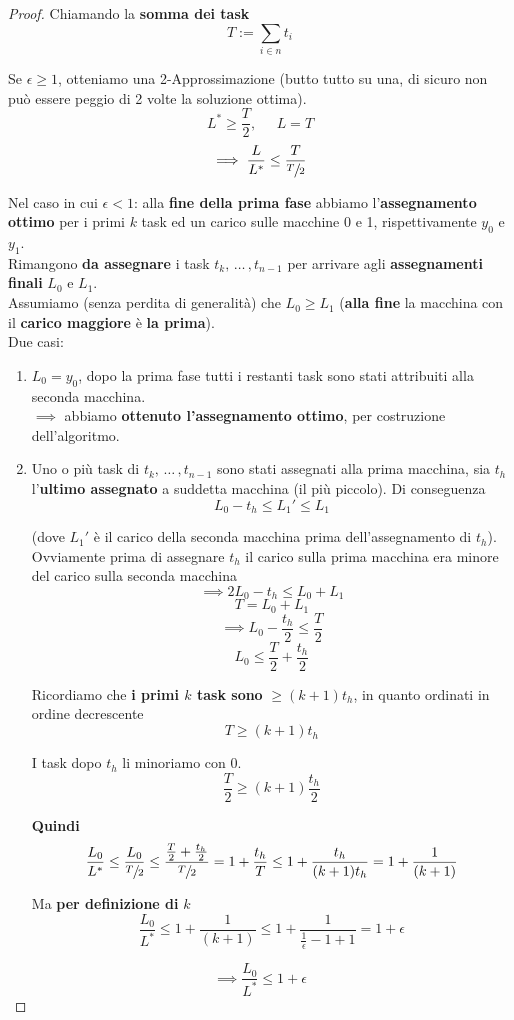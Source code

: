 \documentclass[11pt]{article}
\begin{document}
	\begin{proof}
		Chiamando la \textbf{somma dei task}
		$$ T := \sum_{i \in n} t_i$$
		
		Se $\epsilon \geq 1$, otteniamo una 2-Approssimazione (butto tutto su una, di sicuro non può essere peggio di 2 volte la soluzione ottima).
		$$ L^\ast \geq \frac{T}{2}, \;\;\;\;\; L = T $$
		$$\implies \frac{L}{L^\ast} \leq \frac{T}{\sfrac{T}{2}}$$
		
		Nel caso in cui $\epsilon < 1$: alla \textbf{fine della prima fase} abbiamo l'\textbf{assegnamento ottimo} per i primi $k$ task ed un carico sulle macchine 0 e 1, rispettivamente $y_0$ e $y_1$. \\
		
		Rimangono \textbf{da assegnare} i task $t_k, \, \dots \, , t_{n-1}$ per arrivare agli \textbf{assegnamenti finali} $L_0$ e $L_1$.\\
		
		Assumiamo (senza perdita di generalità) che $L_0 \geq L_1$ (\textbf{alla fine} la macchina con il \textbf{carico maggiore} è \textbf{la prima}).\\
		
		Due casi: 
		\begin{enumerate}
			\item $L_0 = y_0$, dopo la prima fase tutti i restanti task sono stati attribuiti alla seconda macchina.\\
			$\implies$ abbiamo \textbf{ottenuto l'assegnamento ottimo}, per costruzione dell'algoritmo.\\
			
			\item Uno o più task di $t_k, \, \dots \, , t_{n-1}$ sono stati assegnati alla prima macchina, sia $t_h$ l'\textbf{ultimo assegnato} a suddetta macchina (il più piccolo). Di conseguenza
			$$ L_0 - t_h \leq L_1' \leq L_1$$
			
			(dove $L_1'$ è il carico della seconda macchina prima dell'assegnamento di $t_h$). Ovviamente prima di assegnare $t_h$ il carico sulla prima macchina era minore del carico sulla seconda macchina
			$$ \implies 2L_0 - t_h \leq L_0 + L_1 $$
			$$ T = L_0 + L_1$$
			$$ \implies L_0 - \frac{t_h}{2} \leq \frac{T}{2} $$
			$$ L_0 \leq \frac{T}{2} + \frac{t_h}{2} $$
			
			Ricordiamo che \textbf{i primi $k$ task sono} $\geq (k+1) t_h$, in quanto ordinati in ordine decrescente
			$$ T \geq (k+1) t_h $$
			
			I task dopo $t_h$ li minoriamo con 0.
			$$ \frac{T}{2} \geq (k+1) \frac{t_h}{2} $$
			
			\textbf{Quindi}
			$$ \frac{L_0}{L^\ast} \leq \frac{L_0}{\sfrac{T}{2}} \leq \frac{\frac{T}{2} + \frac{t_h}{2}}{\sfrac{T}{2}} = 1 + \frac{t_h}{T} \leq 1 + \frac{t_h}{(k+1) t_h} = 1 + \frac{1}{(k+1)} $$
			
			Ma \textbf{per definizione di} $k$ 
			$$ \frac{L_0}{L^\ast} \leq 1 + \frac{1}{(k+1)} \leq 1 + \frac{1}{\frac{1}{\epsilon} - 1 + 1} = 1 + \epsilon $$
		\end{enumerate}
		$$ \implies  \frac{L_0}{L^\ast} \leq 1 + \epsilon $$
	\end{proof}
	
\end{document}
